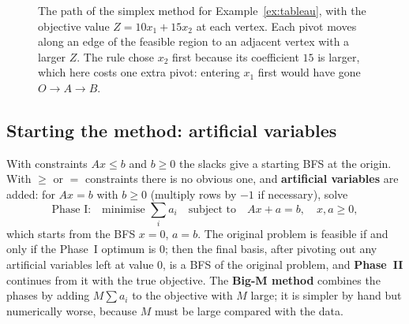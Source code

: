 \documentclass[11pt,a4paper]{article}
\numberwithin{equation}{section}
\theoremstyle{definition}
\begin{document}
\begin{figure}[H]
\centering
{}
\caption{The path of the simplex method for Example~\ref{ex:tableau}, with the objective value $Z = 10x_1 + 15x_2$ at each vertex. Each pivot moves along an edge of the feasible region to an adjacent vertex with a larger $Z$. The rule chose $x_2$ first because its coefficient $15$ is larger, which here costs one extra pivot:
entering $x_1$ first would have gone $O \to A \to B$.}
\label{fig:path}
\end{figure}

\subsection{Starting the method: artificial variables}
\label{ssec:artificial}

With constraints $Ax \leq b$ and $b \geq 0$ the slacks give a starting BFS at the origin. With $\geq$ or $=$ constraints there is no obvious one, and \textbf{artificial variables} are added: for $Ax = b$ with $b \geq 0$ (multiply rows by $-1$ if necessary), solve
\[
\text{Phase I:}\quad\text{minimise } \sum_ia_i \quad\text{subject to}\quad Ax + a = b, \quad x, a \geq 0 ,
\]
which starts from the BFS $x = 0$, $a = b$. The original problem is feasible if and only if the Phase~I optimum is $0$; then the final basis, after pivoting out any artificial variables left at value $0$, is a BFS of the original problem, and \textbf{Phase~II} continues from it with the true objective. The
\textbf{Big-M method} combines the phases by adding $M\sum a_i$ to the objective with $M$ large; it is simpler by hand but numerically worse, because $M$ must be large compared with the data.
\end{document}

